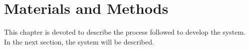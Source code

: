 \chapter{Materials and Methods}

This chapter is devoted to describe the process followed to develop the system.\\

In the next section, the system will be described.